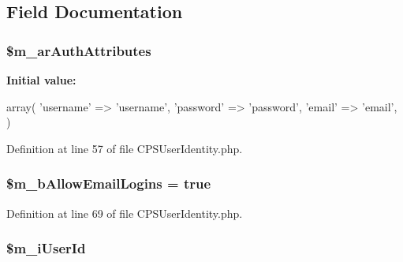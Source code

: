 \subsection{Field Documentation}
\hypertarget{classCPSUserIdentity_a1a6452cba19c0faa3ae64444cbca0694}{
\subsubsection[{\$m\_\-arAuthAttributes}]{\setlength{\rightskip}{0pt plus 5cm}\$m\_\-arAuthAttributes}}
\label{classCPSUserIdentity_a1a6452cba19c0faa3ae64444cbca0694}
{\bfseries Initial value:}
\begin{DoxyCode}
 array(
        'username' => 'username',
        'password' => 'password',
        'email' => 'email',
    )
\end{DoxyCode}


Definition at line 57 of file CPSUserIdentity.php.

\hypertarget{classCPSUserIdentity_aac8ef41aa781120c03b61a9a0b2fba12}{
\subsubsection[{\$m\_\-bAllowEmailLogins}]{\setlength{\rightskip}{0pt plus 5cm}\$m\_\-bAllowEmailLogins = true}}
\label{classCPSUserIdentity_aac8ef41aa781120c03b61a9a0b2fba12}


Definition at line 69 of file CPSUserIdentity.php.

\hypertarget{classCPSUserIdentity_a8df6ae6a230022910f3ee9ad3eb0ae6b}{
\subsubsection[{\$m\_\-iUserId}]{\setlength{\rightskip}{0pt plus 5cm}\$m\_\-iUserId}}
\label{classCPSUserIdentity_a8df6ae6a230022910f3ee9ad3eb0ae6b}


